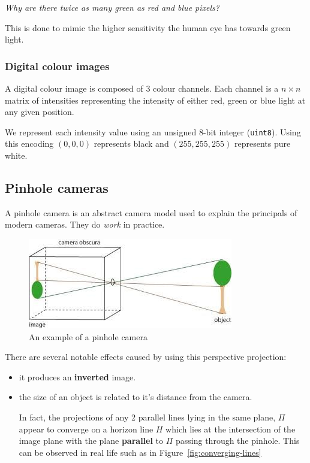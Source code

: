 \documentclass{article}
\begin{document}
\textit{Why are there twice as many green as red and blue pixels?}

This is done to mimic the higher sensitivity the human eye has towards green light.

\subsubsection{Digital colour images}

A digital colour image is composed of 3 colour channels. Each channel is a $n\times n$ matrix of intensities representing the intensity of either red, green or blue light at any given position.

We represent each intensity value using an unsigned 8-bit integer (\texttt{uint8}). Using this encoding $(0,0,0)$ represents black and $(255,255,255)$ represents pure white.


\subsection{Pinhole cameras}
\label{subsec:pinhole}

A pinhole camera is an abstract camera model used to explain the principals of modern cameras. They do \textit{work} in practice.

\begin{figure}[ht]
  \centering
  \includegraphics[scale=0.4]{figures/pinholecamera.jpg}
  \caption{\label{fig:pinhole-camera} An example of a pinhole camera}
\end{figure}

There are several notable effects caused by using this perspective projection:

\begin{itemize}
  \item it produces an \textbf{inverted} image.
  \item the size of an object is related to it's distance from the camera.

        In fact, the projections of any 2 parallel lines lying in the same plane, $\Pi$ appear to converge on a horizon line $H$ which lies at the intersection of the image plane with the plane \textbf{parallel} to $\Pi$ passing through the pinhole. This can be observed in real life such as in Figure~\ref{fig:converging-lines}

\end{itemize}
\end{document}
